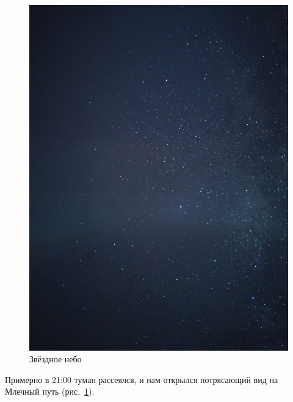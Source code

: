 \begin{figure}[h!]	
	\centering
	\includegraphics[angle=0, width=0.7\linewidth]{../pics/IMG_20240823_205116}
	\caption{Звёздное небо}
	\label{fig:IMG_20240823_205116}
\end{figure}
 
 Примерно в 21:00 туман рассеялся, и нам открылся потрясающий вид на Млечный путь (рис.~\ref{fig:IMG_20240823_205116}).
\newpage
